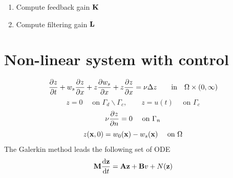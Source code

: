\documentclass[12pt]{article}
\begin{document}
\begin{enumerate}

\item Compute feedback gain ${\mathbf K}$

\item Compute filtering gain ${\mathbf L}$






\end{enumerate}


\section{Non-linear system with control}
\begin{equation*}
\frac{\partial z}{\partial t} + w_s \frac{\partial z}{\partial x} + z \frac{\partial w_s}{\partial x} + z \frac{\partial z}{\partial x} = \nu \Delta z \qquad \mbox{in} \quad \Omega \times (0,\infty)
\end{equation*}
\begin{equation*}
z = 0 \quad \text{ on } \Gamma_d \backslash \Gamma_c, \qquad z = u(t) \quad \text{ on } \Gamma_c
\end{equation*}
\begin{equation*}
\nu \frac{\partial z}{\partial n} = 0 \quad \text{ on } \Gamma_n 
\end{equation*}
\begin{equation*}
z({\mathbf x},0) = w_0({\mathbf x}) - w_s({\mathbf x}) \quad \text{ on } \Omega
\end{equation*}
The Galerkin method leads the following set of ODE
\[
{\mathbf M} \frac{\textrm{d} {\mathbf z}}{\textrm{d} t} = {\mathbf A} {\mathbf z} + {\mathbf B} v + N({\mathbf z})
\]
\end{document}
